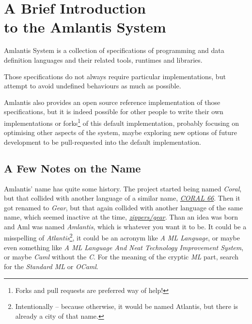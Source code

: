 
\chapter[A Brief Introduction to the Amlantis System]{A Brief Introduction \\ to the Amlantis System}
\label{sec:brief-intro}

Amlantis System is a collection of specifications of programming and data definition languages and their related tools, runtimes and libraries. 

Those specifications do not always require particular implementations, but attempt to avoid undefined behaviours as much as possible. 

Amlantis also provides an open source reference implementation of those specifications, but it is indeed possible for other people to write their own implementations or forks\footnote{Forks and pull requests are preferred way of help!} of this default implementation, probably focusing on optimising other aspects of the system, maybe exploring new options of future development to be pull-requested into the default implementation. 





\section*{A Few Notes on the Name}

Amlantis' name has quite some history. The project started being named {\em Coral}, but that collided with another language of a similar name, \href{https://en.wikipedia.org/wiki/Coral_66}{{\em CORAL 66}}. Then it got renamed to {\em Gear}, but that again collided with another language of the same name, which seemed inactive at the time, \href{https://github.com/zippers/gear}{{\em zippers/gear}}. Than an idea was born and Aml was named {\em Amlantis}, which is whatever you want it to be. It could be a misspelling of {\em Atlantis}\footnote{Intentionally -- because otherwise, it would be named Atlantis, but there is already a city of that name.}, it could be an acronym like {\em A ML Language}, or maybe even something like {\em A ML Language And Neat Technology Improvement System}, or maybe {\em Caml} without the {\em C}. For the meaning of the cryptic {\em ML} part, search for the {\em Standard ML} or {\em OCaml}. 





